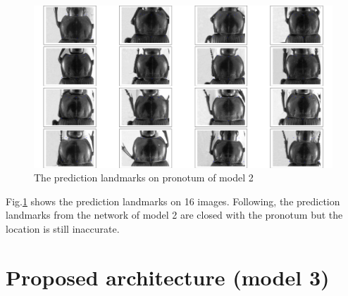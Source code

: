 \documentclass[12pt,a4paper]{article}
\begin{document}
\begin{figure}[h!]
	\centering
	\includegraphics[scale=0.25]{images/figure_1_celia}
	\caption{The prediction landmarks on pronotum of model 2}
	\label{model2pt}
\end{figure}
Fig.\ref{model2pt} shows the prediction landmarks on 16 images. Following, the prediction landmarks from the network of model 2 are closed with the pronotum but the location is still inaccurate.

\section{Proposed architecture (model 3)}
\end{document}
